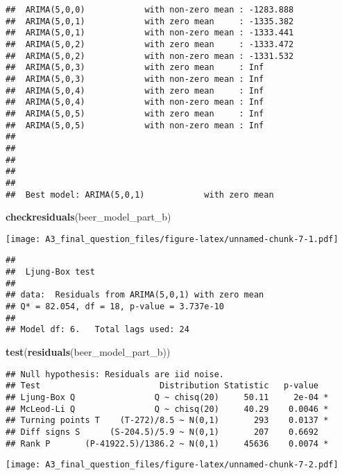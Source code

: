 \documentclass[]{article}
\newenvironment{Shaded}{\begin{snugshade}}{\end{snugshade}}
\newcommand{\KeywordTok}[1]{\textcolor[rgb]{0.13,0.29,0.53}{\textbf{#1}}}
\newcommand{\NormalTok}[1]{#1}
\begin{document}
\begin{verbatim}
##  ARIMA(5,0,0)            with non-zero mean : -1283.888
##  ARIMA(5,0,1)            with zero mean     : -1335.382
##  ARIMA(5,0,1)            with non-zero mean : -1333.441
##  ARIMA(5,0,2)            with zero mean     : -1333.472
##  ARIMA(5,0,2)            with non-zero mean : -1331.532
##  ARIMA(5,0,3)            with zero mean     : Inf
##  ARIMA(5,0,3)            with non-zero mean : Inf
##  ARIMA(5,0,4)            with zero mean     : Inf
##  ARIMA(5,0,4)            with non-zero mean : Inf
##  ARIMA(5,0,5)            with zero mean     : Inf
##  ARIMA(5,0,5)            with non-zero mean : Inf
## 
## 
## 
## 
## 
##  Best model: ARIMA(5,0,1)            with zero mean
\end{verbatim}

\begin{Shaded}
\begin{Highlighting}[]
\KeywordTok{checkresiduals}\NormalTok{(beer_model_part_b)}
\end{Highlighting}
\end{Shaded}

\texttt{[image: A3\_final\_question\_files/figure-latex/unnamed-chunk-7-1.pdf]}

\begin{verbatim}
## 
##  Ljung-Box test
## 
## data:  Residuals from ARIMA(5,0,1) with zero mean
## Q* = 82.054, df = 18, p-value = 3.737e-10
## 
## Model df: 6.   Total lags used: 24
\end{verbatim}

\begin{Shaded}
\begin{Highlighting}[]
\KeywordTok{test}\NormalTok{(}\KeywordTok{residuals}\NormalTok{(beer_model_part_b))}
\end{Highlighting}
\end{Shaded}

\begin{verbatim}
## Null hypothesis: Residuals are iid noise.
## Test                        Distribution Statistic   p-value
## Ljung-Box Q                Q ~ chisq(20)     50.11     2e-04 *
## McLeod-Li Q                Q ~ chisq(20)     40.29    0.0046 *
## Turning points T    (T-272)/8.5 ~ N(0,1)       293    0.0137 *
## Diff signs S      (S-204.5)/5.9 ~ N(0,1)       207    0.6692
## Rank P       (P-41922.5)/1386.2 ~ N(0,1)     45636    0.0074 *
\end{verbatim}

\texttt{[image: A3\_final\_question\_files/figure-latex/unnamed-chunk-7-2.pdf]}
\end{document}

